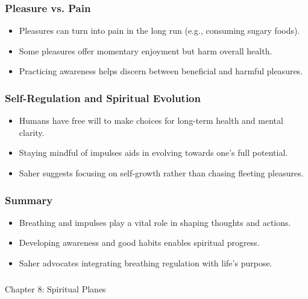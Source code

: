 \begin{frame}[fragile]\frametitle{Pleasure vs. Pain}
    \begin{itemize}
        \item Pleasures can turn into pain in the long run (e.g., consuming sugary foods).
        \item Some pleasures offer momentary enjoyment but harm overall health.
        \item Practicing awareness helps discern between beneficial and harmful pleasures.
    \end{itemize}
\end{frame}

\begin{frame}[fragile]\frametitle{Self-Regulation and Spiritual Evolution}
    \begin{itemize}
        \item Humans have free will to make choices for long-term health and mental clarity.
        \item Staying mindful of impulses aids in evolving towards one’s full potential.
        \item Saher suggests focusing on self-growth rather than chasing fleeting pleasures.
    \end{itemize}
\end{frame}

\begin{frame}[fragile]\frametitle{Summary}
    \begin{itemize}
        \item Breathing and impulses play a vital role in shaping thoughts and actions.
        \item Developing awareness and good habits enables spiritual progress.
        \item Saher advocates integrating breathing regulation with life’s purpose.
    \end{itemize}
\end{frame}

\begin{frame}[fragile]\frametitle{}
\begin{center}
{\Large Chapter 8: Spiritual Planes}
\end{center}
\end{frame}

